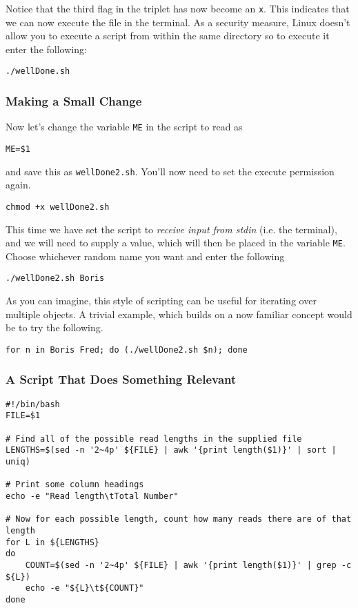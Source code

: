 \begin{steps}
Notice that the third flag in the triplet has now become an \texttt{x}.
This indicates that we can now execute the file in the terminal.
As a security measure, Linux doesn't allow you to execute a script from within the same directory so to execute it enter the following:
\begin{lstlisting}
./wellDone.sh
\end{lstlisting}
\end{steps}

\subsubsection{Making a Small Change}

\begin{steps}
Now let's change the variable \texttt{ME} in the script to read as
\begin{lstlisting}
ME=$1
\end{lstlisting}
and save this as \texttt{wellDone2.sh}.
You'll now need to set the execute permission again.
\begin{lstlisting}
chmod +x wellDone2.sh
\end{lstlisting}
\end{steps}

\begin{information}
This time we have set the script to \textit{receive input from stdin} (i.e. the terminal), and we will need to supply a value, which will then be placed in the variable \texttt{ME}.
Choose whichever random name you want and enter the following
\begin{lstlisting}
./wellDone2.sh Boris
\end{lstlisting}
\end{information}

\begin{advanced}
As you can imagine, this style of scripting can be useful for iterating over multiple objects.
A trivial example, which builds on a now familiar concept would be to try the following.
\begin{lstlisting}
for n in Boris Fred; do (./wellDone2.sh $n); done
\end{lstlisting}
\end{advanced}

\subsubsection*{A Script That Does Something Relevant}
\begin{lstlisting}
#!/bin/bash
FILE=$1

# Find all of the possible read lengths in the supplied file
LENGTHS=$(sed -n '2~4p' ${FILE} | awk '{print length($1)}' | sort | uniq)

# Print some column headings
echo -e "Read length\tTotal Number"

# Now for each possible length, count how many reads there are of that length
for L in ${LENGTHS}
do
	COUNT=$(sed -n '2~4p' ${FILE} | awk '{print length($1)}' | grep -c ${L})
	echo -e "${L}\t${COUNT}" 
done
\end{lstlisting}

